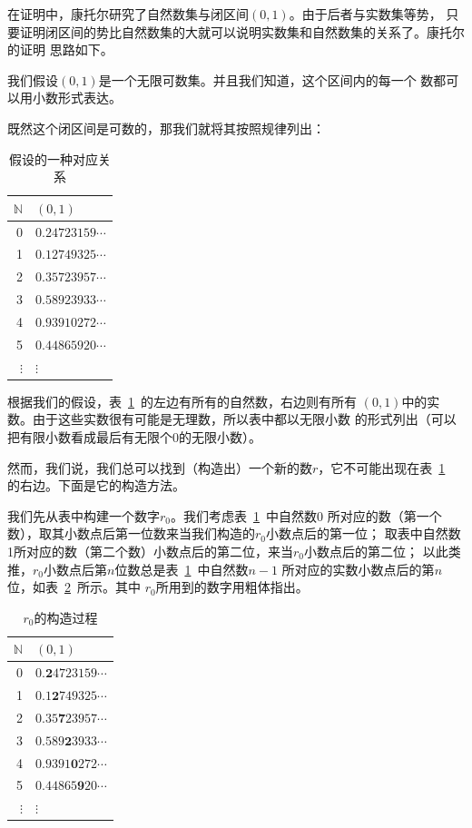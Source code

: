 在证明中，康托尔研究了自然数集与闭区间$\left( 0,1\right) $。由于后者与实数集等势，
只要证明闭区间的势比自然数集的大就可以说明实数集和自然数集的关系了。康托尔的证明
思路如下。

我们假设$\left( 0,1 \right) $是一个无限可数集。并且我们知道，这个区间内的每一个
数都可以用小数形式表达。

既然这个闭区间是可数的，那我们就将其按照规律列出：

\begin{table}[h]
    \centering
    \caption{假设的一种对应关系}\label{tbl:cantor_diagonal}
    \begin{tabular}{r|l}
        $\mathbb{N}$& $\left( 0,1 \right) $\\
        \hline
        0 & $0.24723159\cdots $\\
        1 & $0.12749325\cdots $\\
        2 & $0.35723957\cdots $\\
        3 & $0.58923933\cdots $\\
        4 & $0.93910272\cdots $\\
        5 & $0.44865920\cdots $\\
        $\vdots$ & $\vdots$
    \end{tabular}
\end{table}

根据我们的假设，表~\ref{tbl:cantor_diagonal}~的左边有所有的自然数，右边则有所有
$\left( 0,1 \right) $中的实数。由于这些实数很有可能是无理数，所以表中都以无限小数
的形式列出（可以把有限小数看成最后有无限个0的无限小数）。

然而，我们说，我们总可以找到（构造出）一个新的数$r$，它不可能出现在表~\ref{tbl:cantor_diagonal}~%
的右边。下面是它的构造方法。

我们先从表中构建一个数字$r_{0}$。我们考虑表~\ref{tbl:cantor_diagonal}~中自然数0
所对应的数（第一个数），取其小数点后第一位数来当我们构造的$r_{0}$小数点后的第一位；
取表中自然数1所对应的数（第二个数）小数点后的第二位，来当$r_{0}$小数点后的第二位；
以此类推，$r_{0}$小数点后第$n$位数总是表~\ref{tbl:cantor_diagonal}~中自然数$n-1$
所对应的实数小数点后的第$n$位，如表~\ref{tbl:cantor_diagonal_maker0}~所示。其中
$r_{0}$所用到的数字用粗体指出。

\begin{table}[h]
    \centering
    \caption{$r_{0}$的构造过程}\label{tbl:cantor_diagonal_maker0}
    \begin{tabular}{r|l}
        $\mathbb{N}$& $\left( 0,1 \right) $\\
        \hline
        0 & $0.\mathbf{2}4723159\cdots $\\
        1 & $0.1\mathbf{2}749325\cdots $\\
        2 & $0.35\mathbf{7}23957\cdots $\\
        3 & $0.589\mathbf{2}3933\cdots $\\
        4 & $0.9391\mathbf{0}272\cdots $\\
        5 & $0.44865\mathbf{9}20\cdots $\\
        $\vdots$ & $\vdots$
    \end{tabular}
\end{table}

